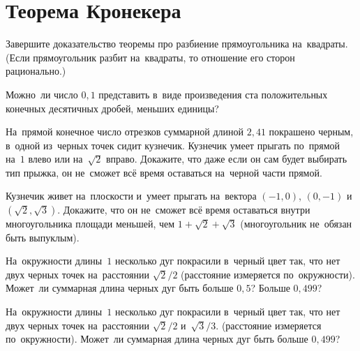 
\section*{Теорема Кронекера}


\begin{problems}

\item
Завершите доказательство теоремы про разбиение прямоугольника на~квадраты.
(Если прямоугольник разбит на~квадраты, то отношение его сторон рационально.)

\item
Можно~ли число $0{,}1$ представить в~виде произведения ста положительных
конечных десятичных дробей, меньших единицы?

\item
На~прямой конечное число отрезков суммарной длиной $2{,}41$ покрашено черным,
в~одной из~черных точек сидит кузнечик.
Кузнечик умеет прыгать по~прямой на~$1$ влево или на~$\sqrt{2}$ вправо.
Докажите, что даже если он сам будет выбирать тип прыжка, он не~сможет всё
время оставаться на~черной части прямой.

\item
Кузнечик живет на~плоскости и~умеет прыгать на~вектора
$(-1, 0)$, $(0, -1)$ и~$(\sqrt{2}, \sqrt{3})$.
Докажите, что он не~сможет всё время оставаться внутри многоугольника площади
меньшей, чем $1 + \sqrt{2} + \sqrt{3}$ (многоугольник не~обязан быть выпуклым).

\item
На~окружности длины~$1$ несколько дуг покрасили в~черный цвет так, что нет двух
черных точек на~расстоянии $\sqrt{2} / 2$
(расстояние измеряется по~окружности).
Может~ли суммарная длина черных дуг быть больше $0{,}5$?
Больше $0{,}499$?

\item
На~окружности длины~$1$ несколько дуг покрасили в~черный цвет так, что нет двух
черных точек на~расстоянии $\sqrt{2} / 2$ и~$\sqrt{3} / 3$.
(расстояние измеряется по~окружности).
Может~ли суммарная длина черных дуг быть больше $0{,}499$?

\end{problems}

